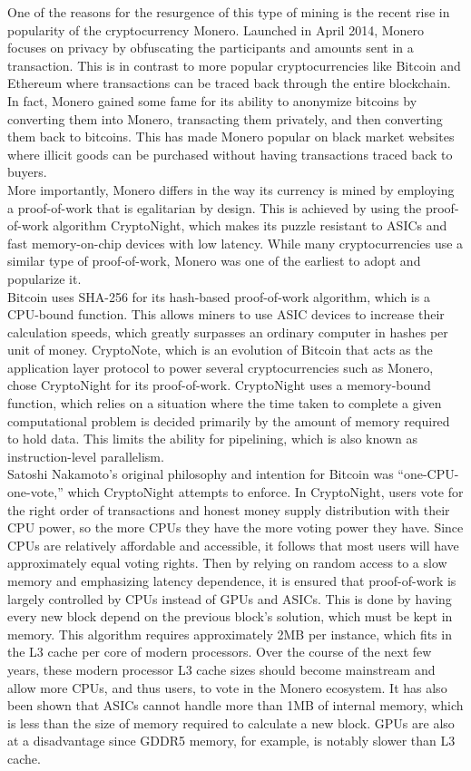 One of the reasons for the resurgence of this type of mining is the recent rise in popularity of the cryptocurrency Monero. Launched in April 2014, Monero focuses on privacy by obfuscating the participants and amounts sent in a transaction. This is in contrast to more popular cryptocurrencies like Bitcoin and Ethereum where transactions can be traced back through the entire blockchain. In fact, Monero gained some fame for its ability to anonymize bitcoins by converting them into Monero, transacting them privately, and then converting them back to bitcoins. This has made Monero popular on black market websites where illicit goods can be purchased without having transactions traced back to buyers. 
\\
More importantly, Monero differs in the way its currency is mined by employing a proof-of-work that is egalitarian by design. This is achieved by using the proof-of-work algorithm CryptoNight, which makes its puzzle resistant to ASICs and fast memory-on-chip devices with low latency. While many cryptocurrencies use a similar type of proof-of-work, Monero was one of the earliest to adopt and popularize it. 
\\
Bitcoin uses SHA-256 for its hash-based proof-of-work algorithm, which is a CPU-bound function. This allows miners to use ASIC devices to increase their calculation speeds, which greatly surpasses an ordinary computer in hashes per unit of money. CryptoNote, which is an evolution of Bitcoin that acts as the application layer protocol to power several cryptocurrencies such as Monero, chose CryptoNight for its proof-of-work. CryptoNight uses a memory-bound function, which relies on a situation where the time taken to complete a given computational problem is decided primarily by the amount of memory required to hold data. This limits the ability for pipelining, which is also known as instruction-level parallelism.  
\\
Satoshi Nakamoto’s original philosophy and intention for Bitcoin was “one-CPU-one-vote,” which CryptoNight attempts to enforce. In CryptoNight, users vote for the right order of transactions and honest money supply distribution with their CPU power, so the more CPUs they have the more voting power they have. Since CPUs are relatively affordable and accessible, it follows that most users will have approximately equal voting rights. Then by relying on random access to a slow memory and emphasizing latency dependence, it is ensured that proof-of-work is largely controlled by CPUs instead of GPUs and ASICs. This is done by having every new block depend on the previous block’s solution, which must be kept in memory. This algorithm requires approximately 2MB per instance, which fits in the L3 cache per core of modern processors. Over the course of the next few years, these modern processor L3 cache sizes should become mainstream and allow more CPUs, and thus users, to vote in the Monero ecosystem. It has also been shown that ASICs cannot handle more than 1MB of internal memory, which is less than the size of memory required to calculate a new block. GPUs are also at a disadvantage since GDDR5 memory, for example, is notably slower than L3 cache. 
